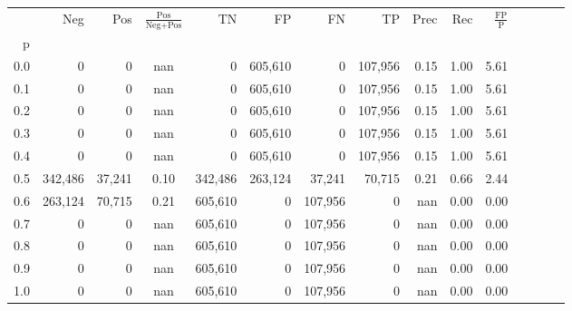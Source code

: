 \begin{tabular}{rrrcrrrrrrrrrrr}
\toprule
{} &      Neg &     Pos & $\frac{\text{Pos}}{\text{Neg}+\text{Pos}}$ &       TN &       FP &       FN &       TP &  Prec &   Rec & $\frac{\text{FP}}{\text{P}}$ \\
p   &          &         &                                            &          &          &          &          &       &       &                              \\
\midrule
0.0 &        0 &       0 &                                        nan &        0 &  605,610 &        0 &  107,956 &  0.15 &  1.00 &                         5.61 \\
0.1 &        0 &       0 &                                        nan &        0 &  605,610 &        0 &  107,956 &  0.15 &  1.00 &                         5.61 \\
0.2 &        0 &       0 &                                        nan &        0 &  605,610 &        0 &  107,956 &  0.15 &  1.00 &                         5.61 \\
0.3 &        0 &       0 &                                        nan &        0 &  605,610 &        0 &  107,956 &  0.15 &  1.00 &                         5.61 \\
0.4 &        0 &       0 &                                        nan &        0 &  605,610 &        0 &  107,956 &  0.15 &  1.00 &                         5.61 \\
0.5 &  342,486 &  37,241 &                                       0.10 &  342,486 &  263,124 &   37,241 &   70,715 &  0.21 &  0.66 &                         2.44 \\
0.6 &  263,124 &  70,715 &                                       0.21 &  605,610 &        0 &  107,956 &        0 &   nan &  0.00 &                         0.00 \\
0.7 &        0 &       0 &                                        nan &  605,610 &        0 &  107,956 &        0 &   nan &  0.00 &                         0.00 \\
0.8 &        0 &       0 &                                        nan &  605,610 &        0 &  107,956 &        0 &   nan &  0.00 &                         0.00 \\
0.9 &        0 &       0 &                                        nan &  605,610 &        0 &  107,956 &        0 &   nan &  0.00 &                         0.00 \\
1.0 &        0 &       0 &                                        nan &  605,610 &        0 &  107,956 &        0 &   nan &  0.00 &                         0.00 \\
\bottomrule
\end{tabular}
